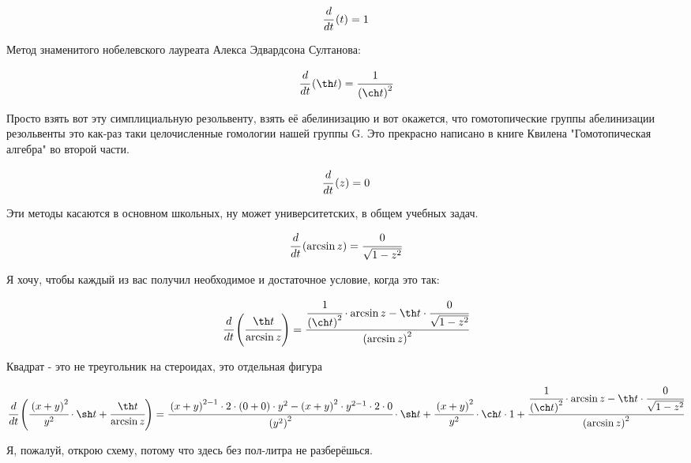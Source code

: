 \begin{dmath}
 \cfrac{d}{d t} \left( t \right) = 1 
\end{dmath}


Метод знаменитого нобелевского лауреата Алекса Эдвардсона Султанова:


\begin{dmath}
 \cfrac{d}{d t} \left( \th t \right) = \cfrac{1}{\left(\ch t\right)^{2}} 
\end{dmath}


Просто взять вот эту симплициальную резольвенту, взять её абелинизацию и вот окажется, что гомотопические группы абелинизации резольвенты это как-раз таки целочисленные гомологии нашей группы G. Это прекрасно написано в книге Квилена "Гомотопическая алгебра" во второй части.


\begin{dmath}
 \cfrac{d}{d t} \left( z \right) = 0 
\end{dmath}


Эти методы касаются в основном школьных, ну может университетских, в общем учебных задач. 


\begin{dmath}
 \cfrac{d}{d t} \left( \arcsin z \right) = \cfrac{0}{\sqrt{  1 - z^{2}}} 
\end{dmath}


Я хочу, чтобы каждый из вас получил необходимое и достаточное условие, когда это так:


\begin{dmath}
 \cfrac{d}{d t} \left( \cfrac{\th t}{\arcsin z} \right) = \cfrac{\cfrac{1}{\left(\ch t\right)^{2}} \cdot \arcsin z - \th t \cdot \cfrac{0}{\sqrt{  1 - z^{2}}}}{\left(\arcsin z\right)^{2}} 
\end{dmath}


Квадрат - это не треугольник на стероидах, это отдельная фигура


\begin{dmath}
 \cfrac{d}{d t} \left( \cfrac{\left(x + y\right)^{2}}{y^{2}} \cdot \sh t + \cfrac{\th t}{\arcsin z} \right) = \cfrac{\left(x + y\right)^{2 - 1} \cdot 2 \cdot \left(0 + 0\right) \cdot y^{2} - \left(x + y\right)^{2} \cdot y^{2 - 1} \cdot 2 \cdot 0}{\left(y^{2}\right)^{2}} \cdot \sh t + \cfrac{\left(x + y\right)^{2}}{y^{2}} \cdot \ch t \cdot 1 + \cfrac{\cfrac{1}{\left(\ch t\right)^{2}} \cdot \arcsin z - \th t \cdot \cfrac{0}{\sqrt{  1 - z^{2}}}}{\left(\arcsin z\right)^{2}} 
\end{dmath}


Я, пожалуй, открою схему, потому что здесь без пол-литра не разберёшься.


